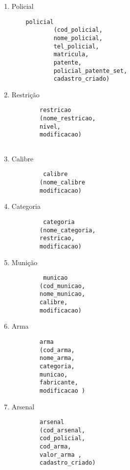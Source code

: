 \documentclass[
article,			%
11pt,				%
oneside,			%
a4paper,			%
english,			%
brazil,				%
sumario=tradicional
]{abntex2}
\begin{document}
	
	\frenchspacing 
	
	
	\maketitle
\begin{multicols}{2}
	\begin{enumerate}
	


	\item Policial
			
	 \begin{verbatim}
	policial
			(cod_policial,
			nome_policial,
			tel_policial, 
			matricula,  
			patente,
			policial_patente_set,
			cadastro_criado)
		\end{verbatim}
		
	\item Restrição
		\begin{verbatim}
		restricao
		(nome_restricao, 
		nivel,
		modificacao)
		
			\end{verbatim}
			
			\item Calibre	
			\begin{verbatim}
		 calibre
		(nome_calibre
		modificacao) 
			\end{verbatim}
			\item Categoria
					\begin{verbatim}
		 categoria
		(nome_categoria,
		restricao,
		modificacao)
	\end{verbatim}
	
	  		\item Munição
			\begin{verbatim}
		 municao
		(cod_municao, 
		nome_municao,
		calibre, 
		modificacao)
			\end{verbatim}
					\item Arma
				\begin{verbatim}
		arma
		(cod_arma,  
		nome_arma,  
		categoria, 
		municao, 
		fabricante,   
		modificacao ) 
		\end{verbatim}	
		\item Arsenal
		
		\begin{verbatim}
		arsenal
		(cod_arsenal,
		cod_policial,
		cod_arma,
		valor_arma ,
		cadastro_criado)
		 \end{verbatim}
		\end{enumerate}				
	\end{multicols}
\end{document}
